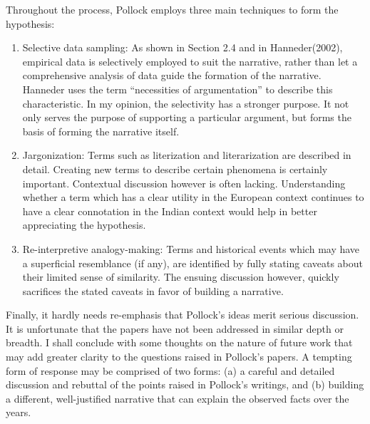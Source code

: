 Throughout the process, Pollock employs three main techniques to form the hypothesis: 
\begin{enumerate}
\itemsep=0pt
\item Selective data sampling: As shown in Section 2.4 and in Hanneder(2002), empirical data is selectively employed to suit the narrative, rather than let a comprehensive analysis of data guide the formation of the narrative. Hanneder uses the term “necessities of argumentation” to describe this characteristic. In my opinion, the selectivity has a stronger purpose. It not only serves the purpose of supporting a particular argument, but forms the basis of forming the narrative itself.  

\item Jargonization: Terms such as literization and literarization are described in detail.  Creating new terms to describe certain phenomena is certainly important. Contextual discussion however is often lacking. Understanding whether a term which has a clear utility in the European context continues to have a clear connotation in the Indian context would help in better appreciating the hypothesis.

\item Re-interpretive analogy-making: Terms and historical events which may have a superficial resemblance (if any), are identified by fully stating caveats about their limited sense of similarity. The ensuing discussion however, quickly sacrifices the stated caveats in favor of building a narrative.
\end{enumerate}

Finally, it hardly needs re-emphasis that Pollock’s ideas merit serious discussion. It is unfortunate that the papers have not been addressed in similar depth or breadth. I shall conclude with some thoughts on the nature of future work that may add greater clarity to the questions raised in Pollock’s papers. A tempting form of response may be comprised of two forms: (a) a careful and detailed discussion and rebuttal of the points raised in Pollock’s writings, and (b) building a different, well-justified narrative that can explain the observed facts over the years. 

